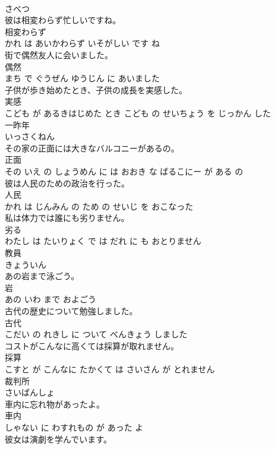 \documentclass[8pt]{extreport}
\begin{document}
\begin{CJK}{UTF8}{min}
\\	さべつ		
\\	彼は相変わらず忙しいですね。	
\\	相変わらず 
\\	かれ は あいかわらず いそがしい です ね			
\\	街で偶然友人に会いました。	
\\	偶然 
\\	まち で ぐうぜん ゆうじん に あいました			
\\	子供が歩き始めたとき、子供の成長を実感した。	
\\	実感 
\\	こども が あるきはじめた とき こども の せいちょう を じっかん した			
\\	一昨年	
\\	いっさくねん		
\\	その家の正面には大きなバルコニーがあるの。	
\\	正面 
\\	その いえ の しょうめん に は おおき な ばるこにー が ある の			
\\	彼は人民のための政治を行った。	
\\	人民 
\\	かれ は じんみん の ため の せいじ を おこなった			
\\	私は体力では誰にも劣りません。	
\\	劣る 
\\	わたし は たいりょく で は だれ に も おとりません			
\\	教員	
\\	きょういん		
\\	あの岩まで泳ごう。	
\\	岩 
\\	あの いわ まで およごう			
\\	古代の歴史について勉強しました。	
\\	古代 
\\	こだい の れきし に ついて べんきょう しました			
\\	コストがこんなに高くては採算が取れません。	
\\	採算 
\\	こすと が こんなに たかくて は さいさん が とれません			
\\	裁判所	
\\	さいばんしょ		
\\	車内に忘れ物があったよ。	
\\	車内 
\\	しゃない に わすれもの が あった よ			
\\	彼女は演劇を学んでいます。	

\end{CJK}
\end{document}
